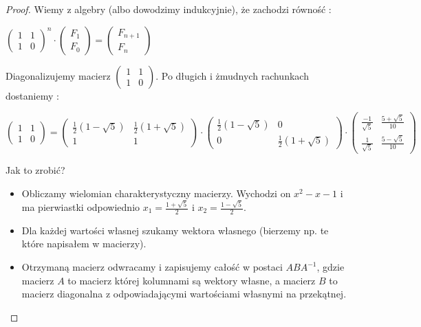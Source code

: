 \documentclass{article}
\begin{document}
\begin{proof}

Wiemy z algebry (albo dowodzimy indukcyjnie), że zachodzi równość :

$\begin{pmatrix} 1 & 1 \\ 1 & 0 \end{pmatrix}^n \cdot \begin{pmatrix} F_1 \\ F_0 \end{pmatrix} =  \begin{pmatrix} F_{n+1} \\ F_n \end{pmatrix} $

Diagonalizujemy macierz $\begin{pmatrix} 1 & 1 \\ 1 & 0 \end{pmatrix}$. Po długich i żmudnych rachunkach dostaniemy :

$$\begin{pmatrix} 1 & 1 \\ 1 & 0 \end{pmatrix} = \begin{pmatrix} \frac{1}{2} \left( 1 - \sqrt{5} \right) & \frac{1}{2} \left( 1 + \sqrt{5} \right) \\ 1 & 1 \end{pmatrix} \cdot \begin{pmatrix} \frac{1}{2} \left( 1 - \sqrt{5} \right) & 0 \\ 0 & \frac{1}{2} \left( 1 + \sqrt{5} \right) \end{pmatrix} \cdot \begin{pmatrix} \frac{-1}{\sqrt{5}} & \frac{5+\sqrt{5}}{10} \\ \frac{1}{\sqrt{5}} & \frac{5-\sqrt{5}}{10} \end{pmatrix}$$

Jak to zrobić?

\begin{itemize}

\item Obliczamy wielomian charakterystyczny macierzy. Wychodzi on $x^2 - x - 1$ i ma pierwiastki odpowiednio $x_1 = \frac{1+ \sqrt{5}}{2}$ i $x_2 = \frac{1 - \sqrt{5}}{2}$.

\item Dla każdej wartości własnej szukamy wektora własnego (bierzemy np. te które napisałem w macierzy).

\item Otrzymaną macierz odwracamy i zapisujemy całość w postaci $ABA^{-1}$, gdzie macierz $A$ to macierz której kolumnami są wektory własne, a macierz $B$ to macierz diagonalna z odpowiadającymi wartościami własnymi na przekątnej.
\end{itemize}


\end{proof}
\end{document}
